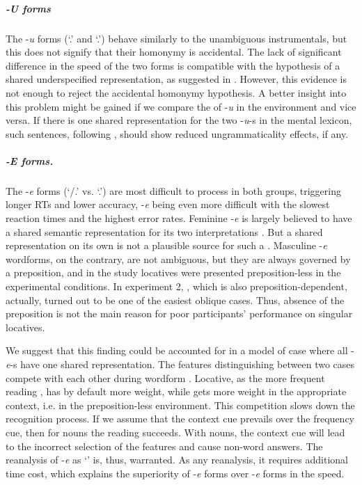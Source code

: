 \documentclass[output=paper, modfonts,newtxmath,hidelinks]{langscibook}
\begin{document}
\subparagraph*{{-U forms}} The -\textit{u} forms (`\accc.\fem' and `\datt.\masc') behave similarly to the unambiguous instrumentals, but this does not signify that their homonymy is accidental. The lack of significant difference in the  speed of the two forms  is compatible with the hypothesis of a shared underspecified representation, as suggested in  \citet{muller2004decomposing,wunderlich2004there}. However, this evidence is not enough to reject the accidental homonymy hypothesis. A better insight into this problem might be gained if we compare the  of  -\textit{u} in the  environment and vice versa. If there is one shared representation for the two -\textit{u}-s in the mental lexicon, such sentences, following \citet{penke2004psycholinguistic, opitz2013neurophysiological}, should show reduced ungrammaticality effects, if any.

\subparagraph*{{-E forms.}} The -\textit{e} forms (`\datt/\locc.\fem' vs. `\locc.\masc') are most difficult to process in both  groups, triggering longer RTs and lower accuracy,  -\textit{e} being even more difficult with the slowest reaction times and the highest error rates. Feminine -\textit{e} is largely believed to have a shared semantic representation for its two interpretations \citep{muller2004decomposing, wiese2004categories, wunderlich2004there}. But a shared representation on its own is not a plausible source for such a . Masculine -\textit{e} wordforms, on the contrary, are not ambiguous, but they are always governed by a preposition, and in the  study locatives were presented preposition-less in the experimental conditions. In experiment 2,  , which is also preposition-dependent, actually, turned out to be one of the easiest oblique cases. Thus, absence of the preposition is not the main reason for poor participants’ performance on singular  locatives. 

We suggest that this finding could be accounted for in a model of  case where all -\textit{e}-s have one shared representation. The features distinguishing between two cases compete with each other during wordform . Locative, as the more frequent reading \citep{samojlova2014frequencies}, has by default more weight, while  gets more weight in the appropriate context, i.e. in the preposition-less environment. This competition slows down the recognition process. If we assume that the context cue prevails over the frequency cue, then for  nouns the  reading succeeds. With  nouns, the context cue will lead to the incorrect selection of the  features and cause non-word answers. The reanalysis of -\textit{e} as `\locc' is, thus, warranted. As any reanalysis, it requires additional time cost, which explains the superiority of  -\textit{e} forms over  -\textit{e} forms in the  speed. 
\end{document}

